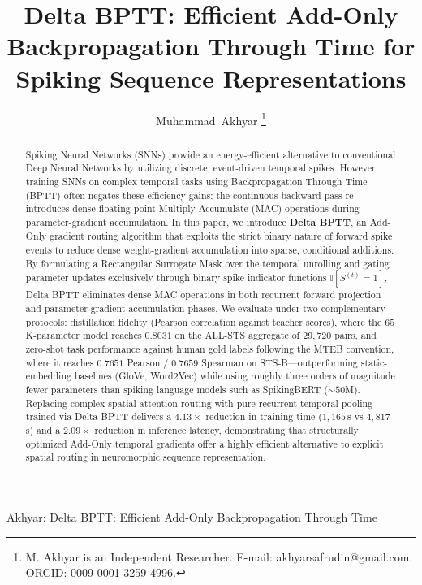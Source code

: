 \documentclass[10pt,journal,compsoc]{IEEEtran}
\begin{document}
\title{Delta BPTT: Efficient Add-Only Backpropagation Through Time for Spiking Sequence Representations}

\author{Muhammad~Akhyar%
        \thanks{M. Akhyar is an Independent Researcher. E-mail: akhyarsafrudin@gmail.com. ORCID: 0009-0001-3259-4996.}%
}

%
{Akhyar: Delta BPTT: Efficient Add-Only Backpropagation Through Time}

\maketitle

\begin{abstract}
Spiking Neural Networks (SNNs) provide an energy-efficient alternative to conventional Deep Neural Networks by utilizing discrete, event-driven temporal spikes. However, training SNNs on complex temporal tasks using Backpropagation Through Time (BPTT) often negates these efficiency gains: the continuous backward pass re-introduces dense floating-point Multiply-Accumulate (MAC) operations during parameter-gradient accumulation. In this paper, we introduce \textbf{Delta BPTT}, an Add-Only gradient routing algorithm that exploits the strict binary nature of forward spike events to reduce dense weight-gradient accumulation into sparse, conditional additions. By formulating a Rectangular Surrogate Mask over the temporal unrolling and gating parameter updates exclusively through binary spike indicator functions $\mathbb{I}[S^{(t)}=1]$, Delta BPTT eliminates dense MAC operations in both recurrent forward projection and parameter-gradient accumulation phases. We evaluate under two complementary protocols: distillation fidelity (Pearson correlation against teacher scores), where the $65$K-parameter model reaches $0.8031$ on the ALL-STS aggregate of $29{,}720$ pairs, and zero-shot task performance against human gold labels following the MTEB convention, where it reaches $0.7651$ Pearson / $0.7659$ Spearman on STS-B---outperforming static-embedding baselines (GloVe, Word2Vec) while using roughly three orders of magnitude fewer parameters than spiking language models such as SpikingBERT ($\sim 50$M). Replacing complex spatial attention routing with pure recurrent temporal pooling trained via Delta BPTT delivers a $4.13\times$ reduction in training time ($1{,}165$\,s vs $4{,}817$\,s) and a $2.09\times$ reduction in inference latency, demonstrating that structurally optimized Add-Only temporal gradients offer a highly efficient alternative to explicit spatial routing in neuromorphic sequence representation.
\end{abstract}
\end{document}
